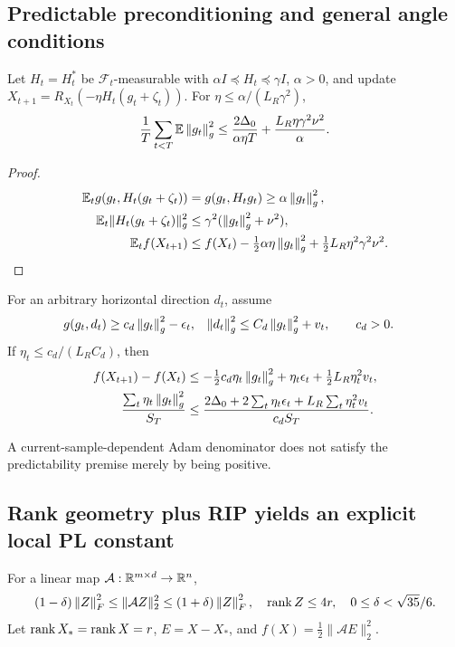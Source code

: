 \subsection{Predictable preconditioning and general angle conditions}
\begin{theorem}
Let $H_t=H_t^*$ be $\mathcal F_t$-measurable with
$\alpha I\preceq H_t\preceq\gamma I$, $\alpha>0$, and update
$X_{t+1}=R_{X_t}(-\eta H_t(g_t+\zeta_t))$.
For $\eta\leq\alpha/(L_R\gamma^2)$,
\begin{equation}
\frac1T\sum_{t<T}\mathbb E\left\lVert g_t\right\rVert_g^2
\leq\frac{2\Delta_0}{\alpha\eta T}
+\frac{L_R\eta\gamma^2\nu^2}{\alpha}.
\end{equation}
\end{theorem}
\begin{proof}
\begin{align}
\mathbb E_tg(g_t,H_t(g_t+\zeta_t))
&=g(g_t,H_tg_t)\geq\alpha\left\lVert g_t\right\rVert_g^2,\\
\mathbb E_t\|H_t(g_t+\zeta_t)\|_g^2
&\leq\gamma^2(\left\lVert g_t\right\rVert_g^2+\nu^2),\\
\mathbb E_t f(X_{t+1})
&\leq f(X_t)-\tfrac12\alpha\eta\left\lVert g_t\right\rVert_g^2
+\tfrac12L_R\eta^2\gamma^2\nu^2.
\end{align}
\end{proof}

\begin{proposition}
For an arbitrary horizontal direction $d_t$, assume
\begin{align}
g(g_t,d_t)&\geq c_d\left\lVert g_t\right\rVert_g^2-\epsilon_t,&
\left\lVert d_t\right\rVert_g^2&\leq C_d\left\lVert g_t\right\rVert_g^2+v_t,\qquad c_d>0 .
\end{align}
If $\eta_t\leq c_d/(L_RC_d)$, then
\begin{align}
f(X_{t+1})-f(X_t)
&\leq-\tfrac12c_d\eta_t\left\lVert g_t\right\rVert_g^2
+\eta_t\epsilon_t+\tfrac12L_R\eta_t^2v_t,\\
\frac{\sum_t\eta_t\left\lVert g_t\right\rVert_g^2}{S_T}
&\leq\frac{2\Delta_0+2\sum_t\eta_t\epsilon_t
+L_R\sum_t\eta_t^2v_t}{c_dS_T}.
\end{align}
\end{proposition}
A current-sample-dependent Adam denominator does not satisfy the
predictability premise merely by being positive.

\subsection{Rank geometry plus RIP yields an explicit local PL constant}
\begin{assumption}
For a linear map $\mathcal A:\mathbb R^{m\times d}\to\mathbb R^n$,
\begin{equation}
(1-\delta)\left\lVert Z\right\rVert_F^2\leq\|\mathcal A Z\|_2^2
\leq(1+\delta)\left\lVert Z\right\rVert_F^2,\quad\operatorname{rank} Z\leq4r,\quad0\leq\delta<\sqrt{35}/6 .
\label{eq:rigid-RIP}
\end{equation}
Let $\operatorname{rank} X_*=\operatorname{rank} X=r$, $E=X-X_*$, and
$f(X)=\frac12\|\mathcal A E\|_2^2$.
\end{assumption}

